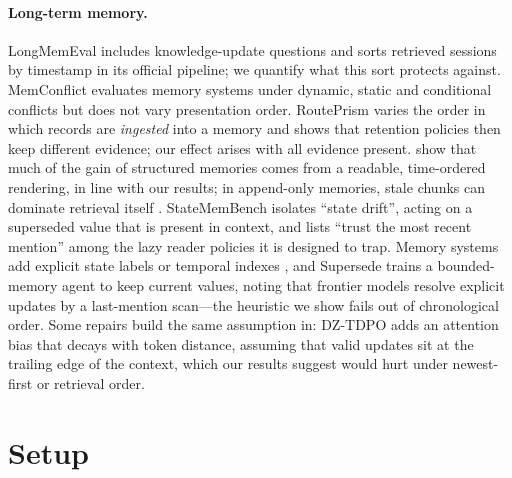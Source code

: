 \documentclass[11pt]{article}
\begin{document}
\paragraph{Long-term memory.}
LongMemEval \citep{wu2025longmemeval} includes knowledge-update questions and sorts retrieved sessions by timestamp in its official pipeline; we quantify what this sort protects against.
MemConflict \citep{tao2026memconflict} evaluates memory systems under dynamic, static and conditional conflicts but does not vary presentation order.
RoutePrism \citep{xu2026routeprism} varies the order in which records are \emph{ingested} into a memory and shows that retention policies then keep different evidence; our effect arises with all evidence present.
\citet{jiang2026render} show that much of the gain of structured memories comes from a readable, time-ordered rendering, in line with our results; in append-only memories, stale chunks can dominate retrieval itself \citep{haddadpajouh2026mutable}.
StateMemBench \citep{fan2026statemem} isolates ``state drift'', acting on a superseded value that is present in context, and lists ``trust the most recent mention'' among the lazy reader policies it is designed to trap.
Memory systems add explicit state labels \citep{shi2026atma} or temporal indexes \citep{liu2026segtree}, and Supersede \citep{patel2026supersede} trains a bounded-memory agent to keep current values, noting that frontier models resolve explicit updates by a last-mention scan---the heuristic we show fails out of chronological order.
Some repairs build the same assumption in: DZ-TDPO \citep{liao2025dztdpo} adds an attention bias that decays with token distance, assuming that valid updates sit at the trailing edge of the context, which our results suggest would hurt under newest-first or retrieval order.

\section{Setup}
\label{sec:setup}
\end{document}
